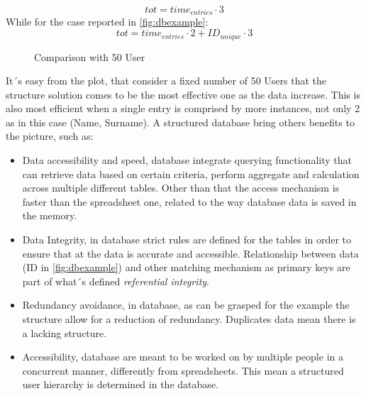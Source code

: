 \documentclass[../main.tex]{subfiles}
\begin{document}
\begin{equation}
    tot = time_{entries} \cdot 3
\end{equation}
While for the case reported in \ref{fig:dbexample}:
\begin{equation}
    tot = time_{entries} \cdot 2 + ID_{unique} \cdot 3
\end{equation}
\begin{figure}[H]
    \centering
{}
    \caption{Comparison with 50 User}
    \label{fig:my_label}
\end{figure}
It´s easy from the plot, that consider a fixed number of 50 Users that the structure solution comes to be the most effective one as the data increase. This is also most efficient when a single entry is comprised by more instances, not only 2 as in this case (Name, Surname). A structured database bring others benefits to the picture, such as:
\begin{itemize}
    \item Data accessibility and speed, database integrate querying functionality that can retrieve data based on certain criteria, perform aggregate and calculation across multiple different tables. Other than that the access mechanism is faster than the spreadsheet one, related to the way database data is saved in the memory. 
    \item Data Integrity, in database strict rules are defined for the tables in order to ensure that at the data is accurate and accessible. Relationship between data (ID in \ref{fig:dbexample}) and other matching mechanism as primary keys are part of what´s defined \textit{referential integrity}.
    \item Redundancy avoidance, in database, as can be grasped for the example the structure allow for a reduction of redundancy. Duplicates data mean there is a lacking structure. 
    \item Accessibility, database are meant to be worked on by multiple people in a concurrent manner, differently from spreadsheets. This mean a structured user hierarchy is determined in the database. 
\end{itemize}
\end{document}

